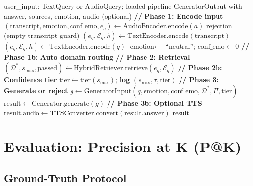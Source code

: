 \documentclass[12pt,a4paper]{article}
\theoremstyle{definition}
\theoremstyle{plain}
\theoremstyle{remark}
\begin{document}
\begin{algorithm}[H]
\caption{Full Query Pipeline (MIVAKnight.query)}
\label{alg:query}
\begin{algorithmic}[1]
\Require user\_input: TextQuery or AudioQuery; loaded pipeline
\Ensure GeneratorOutput with answer, sources, emotion, audio (optional)
\State \textbf{// Phase 1: Encode input}
  \State $(\text{transcript}, \text{emotion}, \text{conf\_emo}, e_a) \gets \text{AudioEncoder.encode}(a)$
    \State \Return rejection (empty transcript guard)
  \EndIf
  \State $(e_q, \mathcal{E}_q, h) \gets \text{TextEncoder.encode}(\text{transcript})$
  \State $(e_q, \mathcal{E}_q, h) \gets \text{TextEncoder.encode}(q)$
  \State $\text{emotion} \gets$ ``neutral''; $\text{conf\_emo} \gets 0$
\EndIf
\State \textbf{// Phase 1b: Auto domain routing}
  \State {}
\EndIf
\State \textbf{// Phase 2: Retrieval}
\State $(\mathcal{D}^*, s_{\max}, \text{passed}) \gets \text{HybridRetriever.retrieve}(e_q, \mathcal{E}_q)$
\State \textbf{// Phase 2b: Confidence tier}
\State $\text{tier} \gets \mathrm{tier}(s_{\max})$; \textbf{log} $(s_{\max}, \tau, \text{tier})$
\State \textbf{// Phase 3: Generate or reject}
  \State \Return {}
\EndIf
\State $g \gets \mathrm{GeneratorInput}(q, \text{emotion}, \text{conf\_emo}, \mathcal{D}^*, \Pi, \text{tier})$
\State $\text{result} \gets \text{Generator.generate}(g)$
\State \textbf{// Phase 3b: Optional TTS}
  \State $\text{result.audio} \gets \text{TTSConverter.convert}(\text{result.answer})$
\EndIf
\State \Return result
\end{algorithmic}
\end{algorithm}

\newpage
\section{Evaluation: Precision at K (P@K)}

\subsection{Ground-Truth Protocol}
\end{document}
